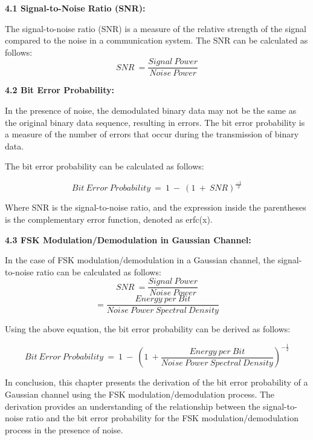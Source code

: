 \documentclass{article} %
\begin{document}
\noindent 

\noindent \textbf{4.1 Signal-to-Noise Ratio (SNR):}

\noindent The signal-to-noise ratio (SNR) is a measure of the relative strength of the signal compared to the noise in a communication system. The SNR can be calculated as follows:
\[SNR\ =\frac{Signal\ Power}{Noise\ Power}\] 


\noindent \textbf{4.2 Bit Error Probability:}

\noindent In the presence of noise, the demodulated binary data may not be the same as the original binary data sequence, resulting in errors. The bit error probability is a measure of the number of errors that occur during the transmission of binary data.

\noindent The bit error probability can be calculated as follows:

\noindent 
\[Bit\ Error\ Probability\ =\ 1\ -{\ (1\ +\ SNR)}^{\frac{-1}{2}}\] 


\noindent Where SNR is the signal-to-noise ratio, and the expression inside the parentheses is the complementary error function, denoted as erfc(x).

\noindent 

\noindent \textbf{4.3 FSK Modulation/Demodulation in Gaussian Channel:}

\noindent In the case of FSK modulation/demodulation in a Gaussian channel, the signal-to-noise ratio can be calculated as follows:
\[SNR\ =\frac{Signal\ Power}{Noise\ Power}\] 
\[=\frac{Energy\ per\ Bit}{Noise\ Power\ Spectral\ Density}\] 


\noindent Using the above equation, the bit error probability can be derived as follows:

\noindent 
\[Bit\ Error\ Probability\ =\ 1\ -\ {\left(1\ +\frac{Energy\ per\ Bit}{Noise\ Power\ Spectral\ Density}\right)}^{-\frac{1}{2}}\] 


\noindent In conclusion, this chapter presents the derivation of the bit error probability of a Gaussian channel using the FSK modulation/demodulation process. The derivation provides an understanding of the relationship between the signal-to-noise ratio and the bit error probability for the FSK modulation/demodulation process in the presence of noise.\textbf{}

\noindent 
\end{document}
